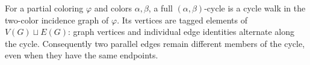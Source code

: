\begin{definition}
For a partial coloring \(\varphi\) and colors \(\alpha,\beta\), a full
\((\alpha,\beta)\)-cycle is a cycle walk in the two-color incidence graph
of \(\varphi\).  Its vertices are tagged elements of \(V(G)\sqcup E(G)\):
graph vertices and individual edge identities alternate along the cycle.
Consequently two parallel edges remain different members of the cycle, even
when they have the same endpoints.
\end{definition}
